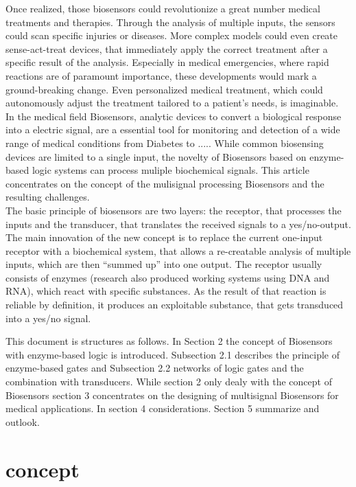\documentclass[runningheads]{llncs}
\begin{document}
	Once realized, those biosensors could revolutionize a great number medical treatments and therapies. Through the analysis of multiple inputs, the sensors could scan specific injuries or diseases. More complex models could even create sense-act-treat devices, that immediately apply the correct treatment after a specific result of the analysis. Especially in medical emergencies, where rapid reactions are of paramount importance, these developments would mark a ground-breaking change. Even personalized medical treatment, which could autonomously adjust the treatment tailored to a patient’s needs, is imaginable.\\
	
	
	In the medical field Biosensors, analytic devices to convert a biological response into a electric signal, are a essential tool for monitoring and detection of a wide range of medical conditions from Diabetes to .....
	While common biosensing devices are limited to a single input, the novelty of Biosensors based on enzyme-based logic systems can process muliple biochemical signals. This article concentrates on the concept of the mulisignal processing Biosensors and the resulting challenges.\\
	
	The basic principle of biosensors are two layers: the receptor, that processes the inputs and the transducer, that translates the received signals to a yes/no-output. The main innovation of the new concept is to replace the current one-input receptor with a biochemical system, that allows a re-creatable analysis of multiple inputs, which are then “summed up” into one output. The receptor usually consists of enzymes (research also produced working systems using DNA and RNA), which react with specific substances. As the result of that reaction is reliable by definition, it produces an exploitable substance, that gets transduced into a yes/no signal.
	

	This document is structures as follows. In Section 2 the concept of Biosensors with enzyme-based logic is introduced. Subsection 2.1 describes the principle of enzyme-based gates and Subsection 2.2 networks of logic gates and the combination with transducers. While section 2 only dealy with the concept of Biosensors section 3 concentrates on the designing of multisignal Biosensors for medical applications.
	In section 4 considerations. Section 5 summarize and outlook. 
\section{concept}
\end{document}
